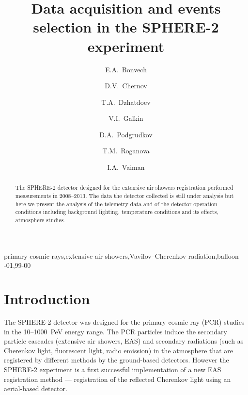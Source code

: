 \documentclass[final,5p,times,twocolumn]{elsarticle}
\begin{document}
\tableofcontents  %
\begin{frontmatter}
\title{Data acquisition and events selection in the SPHERE-2 experiment}

\author[address1]{E.A.~Bonvech}
\author[address1]{D.V.~Chernov}
\author[address1]{T.A.~Dzhatdoev}
\author[address2]{V.I.~Galkin}
\author[address2,address1]{D.A.~Podgrudkov}
\author[address1]{T.M.~Roganova}
\author[address2]{I.A.~Vaiman}
\address[address1]{Federal State Budget Educational Institution of Higher Education, M.V. Lomonosov Moscow State University, Skobeltsyn Institute of Nuclear Physics (SINP MSU), 1(2), Leninskie gory, GSP-1, 119991 Moscow, Russia}
\address[address2]{Federal State Budget Educational Institution of Higher Education, M.V. Lomonosov Moscow State University, Department of Physics, 1(2), Leninskie gory, GSP-1, 119991 Moscow, Russia}

\begin{abstract}
The SPHERE-2 detector designed for the extensive air showers registration performed measurements in 2008--2013. The data the detector collected is still under analysis but here we present the analysis of the telemetry data and of the detector operation conditions including background lighting, temperature conditions and its effects, atmosphere studies.
\end{abstract}

\begin{keyword}
primary cosmic rays\sep extensive air showers\sep Vavilov--Cherenkov radiation\sep balloon
-01\sep  99-00
\end{keyword}
\end{frontmatter}
\linenumbers


\section{Introduction}
The SPHERE-2 detector was designed for the primary cosmic ray (PCR) studies in the 10--1000~PeV energy range. The PCR particles induce the secondary particle cascades (extensive air showers, EAS) and secondary radiations (such as Cherenkov light, fluorescent light, radio emission) in the atmosphere that are registered by different methods by the ground-based detectors. However the SPHERE-2 experiment is a first successful implementation of a new EAS registration method --- registration of the reflected Cherenkov light using an aerial-based detector. 
\end{document}
